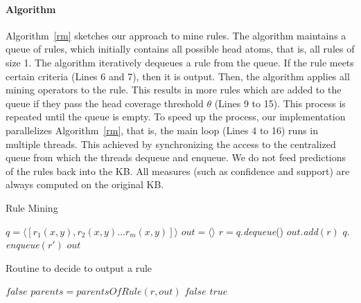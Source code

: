 \paragraph{Algorithm} \label{algo}
Algorithm~\ref{rm} sketches our approach to mine rules. The algorithm maintains a queue of rules, 
which initially contains all possible head atoms, that is,
all rules of size 1.
The algorithm iteratively dequeues a rule from the queue. If the rule 
meets certain criteria (Lines 6 and 7), then it is output.
Then, the algorithm applies all mining operators to the rule. This results in more rules which are added to 
the queue if they pass the head coverage threshold $\theta$ (Lines 9 to 15).
This process is repeated until the queue is empty. 
To speed up the process, our implementation parallelizes Algorithm~\ref{rm}, that is, the main loop (Lines 4 to 16) runs
in multiple threads. 
This achieved by synchronizing the access to the centralized queue from which the threads dequeue and enqueue.
We do not feed predictions of the rules back into the KB. All measures (such as confidence and support) are always computed on the original KB.



\begin{algorithm}
\caption{Rule Mining}
\label{rm}
\begin{algorithmic}[1]
    \State $q = \langle [r_1(x,y), r_2(x,y) \dots r_m(x,y)] \rangle$
    \State $out = \langle \rangle$
	  \State $r = q.$\emph{dequeue}()
	    \State $out.$\emph{add}$(r)$
	  \EndIf
		    \State $q.$\emph{enqueue}$(r')$
		  \EndIf
		\EndFor
	  \EndFor
	\EndWhile
    \State \Return $out$
\EndFunction
\end{algorithmic}
\end{algorithm}

\begin{algorithm}
\caption{Routine to decide to output a rule}
\label{pfo}
\begin{algorithmic}[1]
      \State \Return $false$
    \EndIf 
    \State $parents = parentsOfRule(r, out)$
	\State \Return $false$
      \EndIf
    \EndFor
    \State \Return $true$
\EndFunction
\end{algorithmic}
\end{algorithm}

